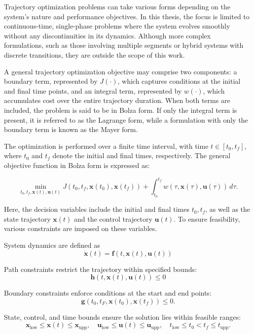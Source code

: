Trajectory optimization problems can take various forms depending on the system's nature and performance objectives. In this thesis, the focus is limited to continuous-time, single-phase problems where the system evolves smoothly without any discontinuities in its dynamics. Although more complex formulations, such as those involving multiple segments or hybrid systems with discrete transitions, they are outside the scope of this work.

A general trajectory optimization objective may comprise two components: a boundary term, represented by \( J(\cdot) \), which captures conditions at the initial and final time points, and an integral term, represented by \( w(\cdot) \), which accumulates cost over the entire trajectory duration. When both terms are included, the problem is said to be in Bolza form. If only the integral term is present, it is referred to as the Lagrange form, while a formulation with only the boundary term is known as the Mayer form.

The optimization is performed over a finite time interval, with time \( t \in [t_0, t_f] \), where \( t_0 \) and \( t_f \) denote the initial and final times, respectively. The general objective function in Bolza form is expressed as:


\[
\min_{t_0, t_f, \mathbf{x}(t), \mathbf{u}(t)} J(t_0, t_f, \mathbf{x}(t_0), \mathbf{x}(t_f)) + \int_{t_0}^{t_f} w(\tau, \mathbf{x}(\tau), \mathbf{u}(\tau)) \, d\tau.
\]

Here, the decision variables include the initial and final times \( t_0, t_f \), as well as the state trajectory \( \mathbf{x}(t) \) and the control trajectory \( \mathbf{u}(t) \). To ensure feasibility, various constraints are imposed on these variables.

System dynamics are defined as 
\[
\dot{\mathbf{x}}(t) = \mathbf{f}(t, \mathbf{x}(t), \mathbf{u}(t))
\]

Path constraints restrict the trajectory within specified bounds:
\[
\mathbf{h}(t, \mathbf{x}(t), \mathbf{u}(t)) \leq 0
\]

Boundary constraints enforce conditions at the start and end points:
\[
\mathbf{g}(t_0, t_F, \mathbf{x}(t_0), \mathbf{x}(t_f)) \leq 0.
\]

State, control, and time bounds ensure the solution lies within feasible ranges:
\[
\mathbf{x}_\text{low} \leq \mathbf{x}(t) \leq \mathbf{x}_\text{upp}, \quad 
\mathbf{u}_\text{low} \leq \mathbf{u}(t) \leq \mathbf{u}_\text{upp}, \quad 
t_\text{low} \leq t_0 < t_f \leq t_\text{upp}.
\]

